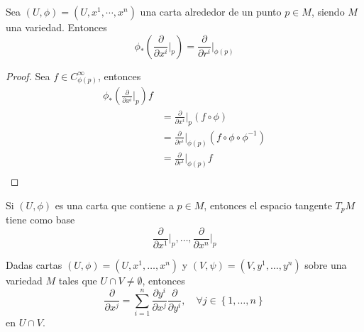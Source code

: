 \documentclass[12pt]{report}
\theoremstyle{largebreak}
\begin{document}
    \setcounter{propo}{8}

    \begin{propo}
        Sea $(U,\phi)=(U,x^1,\cdots,x^n)$ una carta alrededor de un punto $p\in M$, siendo $M$ una variedad. Entonces
        \begin{equation*}
            \phi_*\left(\frac{\partial}{\partial x^i}\Big|_{p}\right)=\frac{\partial}{\partial r^i}\Big|_{\phi(p)}
        \end{equation*}
    \end{propo}

    \begin{proof}
        Sea $f\in C_{\phi(p)}^\infty$, entonces
        \begin{equation*}
            \begin{split}
                \phi_*\left(\frac{\partial}{\partial x^i}\Big|_{p}\right)f\\
                &=\frac{\partial}{\partial x^i}\Big|_{p}(f\circ\phi)\\
                &=\frac{\partial}{\partial r^i}\Big|_{\phi(p)}(f\circ\phi\circ\phi^{-1})\\
                &=\frac{\partial}{\partial r^i}\Big|_{\phi(p)}f\\
            \end{split}
        \end{equation*}
    \end{proof}

    \begin{propo}
        Si $(U,\phi)$ es una carta que contiene a $p\in M$, entonces el espacio tangente $T_pM$ tiene como base
        \begin{equation*}
            \frac{\partial}{\partial x^1}\Big|_p,\dots,\frac{\partial}{\partial x^n}\Big|_p
        \end{equation*}
    \end{propo}

    \begin{propo}
        Dadas cartas $(U,\phi)=(U,x^1,\dots,x^n)$ y $(V,\psi)=(V,y^1,\dots,y^n)$ sobre una variedad $M$ tales que $U\cap V\neq \emptyset$, entonces
        \begin{equation*}
            \frac{\partial}{\partial x^j}=\sum_{i=1}^n\frac{\partial y^i}{\partial x^j}\frac{\partial}{\partial y^i},\quad \forall j\in\left\{1,\dots,n\right\}
        \end{equation*}
        en $U\cap V$.
    \end{propo}

    \newpage
\end{document}
